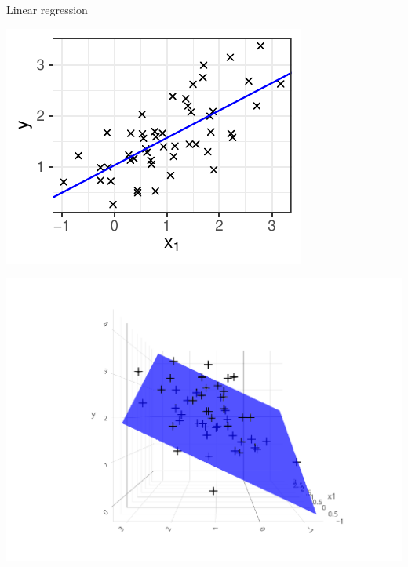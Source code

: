 \documentclass[11pt,compress,t,notes=noshow, xcolor=table]{beamer}
\begin{document}
\begin{vbframe}{Linear regression}
\begin{itemize}
\end{itemize}
\vfill
\begin{minipage}{0.4\textwidth}
    \includegraphics[width=\textwidth]{figure/reg_l2_basic_lm.pdf} 
\end{minipage}
\hspace{1cm}
\begin{minipage}{0.4\textwidth}
    \includegraphics[width=1.2\textwidth, trim=100 0 0 20, clip]{
    figure/reg_l2_basic_lm_biv.pdf} 
\end{minipage}

\end{vbframe} 

\end{document}
